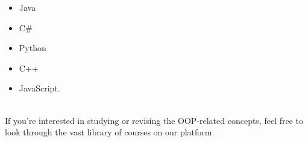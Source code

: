 \begin{itemize}
\item
\protect{}\label{e_9UOE-qogs26mdCGIcp5}
Java
\item
\protect{}\label{v8AkNUEpJiW7Q0kPtu-KC}
C\#
\item
\protect{}\label{_to0u1sIMeH9SHLyHuvlU}
Python
\item
\protect{}\label{pWzI2d6YMMDTYVE5PBREf}
C++
\item
\protect{}\label{vxL7Nppg4nrXEhaGuEq-w}
JavaScript.
\end{itemize}
\\
If you're interested in studying or revising the OOP-related concepts, feel free to look through the vast library of courses on our platform.

